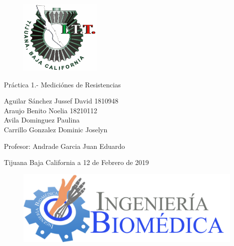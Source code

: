 \documentclass[11pt,a4paper]{report}
\begin{document}
	
	\begin{titlepage}
		
		\begin{center}
			\vspace*{-1in}
			\begin{figure}[t]
				\begin{flushleft}
					\includegraphics[width=4cm]{LOGO_ITT_2005}
					
				\end{flushleft}
			\end{figure}
		
			
				\begin{huge}
					\vspace*{3cm}
					Pr\'actica 1.- Medici\'ones de Resistencias\\
					\vspace*{3cm}
				\end{huge}
			\begin{Large}
			
			Aguilar S\'anchez Jussef David \hspace{3cm}1810948\\
			Araujo Benito Noelia \hspace{3cm} 18210112\\
			Avila Dominguez Paulina\\
			Carrillo Gonzalez Dominic Joselyn\\
			
			
			\vspace*{4cm}
		
				Profesor: Andrade Garcia Juan Eduardo \\
			
			\vspace*{4cm}
			
				Tijuana Baja California a 12 de Febrero de 2019 \\
			\end{Large}
			
			\begin{figure}[b]
				\begin{flushright}
					\includegraphics[width=0.4\linewidth]{BIOMEDICA_HEADING1-2048x672}
					
					\label{fig:biomedicaheading1-2048x672}
				\end{flushright}
				
			\end{figure}
			
		
		\end{center}
		
	\end{titlepage}
	
\end{document}
